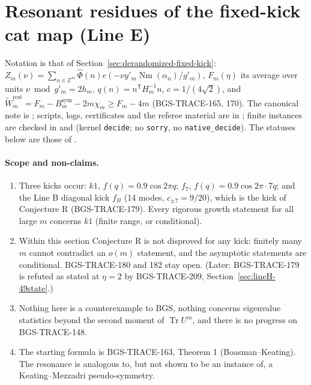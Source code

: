 \section{Resonant residues of the fixed-kick cat map (Line E)}
\label{sec:resonant-residue-lineE}
Notation is that of Section~\ref{sec:derandomized-fixed-kick}: \(Z_m(\nu)=\sum_{n\in\mathbb Z^m}\hat\Phi(n)e(-\nu y'_m\operatorname{Nm}(\alpha_n)/g'_m)\),
\(F_m(\eta)\) its average over units \(\nu\bmod g'_m=2h_m\), \(q(n)=n^{\mathsf T}H_m^{-1}n\), \(c=1/(4\sqrt2)\), and
\(\tilde W^{\mathrm{rest}}_m=F_m-B^{\mathrm{sym}}_m-2m\chi_m\ge F_m-4m\) (BGS-TRACE-165, 170).
The canonical note is ; scripts, logs, certificates and the referee material are in
; finite instances are checked in  and 
(kernel \texttt{decide}; no \texttt{sorry}, no \texttt{native\_decide}). The statuses below are those of .

\paragraph{Scope and non-claims.}
\begin{enumerate}[label=(\arabic*)]
\item Three kicks occur: \(k1\), \(f(q)=0.9\cos2\pi q\); \(f_7\), \(f(q)=0.9\cos2\pi\cdot7q\); and the Line B diagonal kick \(f_B\) (14 modes, \(c_{\pm7}=9/20\)), which is the kick of Conjecture R (BGS-TRACE-179). Every rigorous growth statement for all large \(m\) concerns \(k1\) (finite range, or conditional).
\item Within this section Conjecture R is not disproved for any kick: finitely many \(m\) cannot contradict an \(o(m)\) statement, and the asymptotic statements are conditional. BGS-TRACE-180 and 182 stay open. (Later: BGS-TRACE-179 is refuted as stated at \(\eta=2\) by BGS-TRACE-209, Section~\ref{sec:lineH-49state}.)
\item Nothing here is a counterexample to BGS, nothing concerns eigenvalue statistics beyond the second moment of \(\operatorname{Tr}U^m\), and there is no progress on BGS-TRACE-148.
\item The starting formula is BGS-TRACE-163, Theorem 1 (Boasman--Keating). The resonance is analogous to, but not shown to be an instance of, a Keating--Mezzadri pseudo-symmetry.
\end{enumerate}

